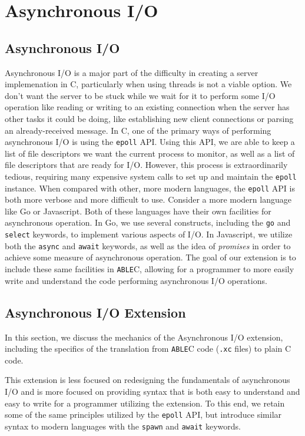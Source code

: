 \documentclass[main.tex]{subfiles}
\begin{document}
\section{Asynchronous I/O}

\subsection{Asynchronous I/O}
Asynchronous I/O is a major part of the difficulty in creating a server
implemenation in C, particularly when using threads is not a viable option. We
don't want the server to be stuck while we wait for it to perform some I/O
operation like reading or writing to an existing connection when the server has
other tasks it could be doing, like establishing new client connections or
parsing an already-received message. In C, one of the primary ways of performing
asynchronous I/O is using the \verb|epoll| API. Using this API, we are able to
keep a list of file descriptors we want the current process to monitor, as well
as a list of file descriptors that are ready for I/O. However, this process is
extraordinarily tedious, requiring many expensive system calls to set up and
maintain the \verb|epoll| instance. When compared with other, more modern
languages, the \verb|epoll| API is both more verbose and more difficult to use.
Consider a more modern language like Go or Javascript. Both of these languages
have their own facilities for asynchronous operation. In Go, we use several
constructs, including the \verb|go| and \verb|select| keywords, to implement
various aspects of I/O. In Javascript, we utilize both the \verb|async| and
\verb|await| keywords, as well as the idea of \emph{promises} in order to
achieve some measure of asynchronous operation. The goal of our extension is to
include these same facilities in \verb|ABLE|C, allowing for a programmer to more
easily write and understand the code performing asynchronous I/O operations.

\subsection{Asynchronous I/O Extension}
In this section, we discuss the mechanics of the Asynchronous I/O extension, including
the specifics of the translation from \verb|ABLE|C code (\verb|.xc| files) to plain C code.

This extension is less focused on redesigning the fundamentals of asynchronous I/O and is more focused
on providing syntax that is both easy to understand and easy to write for a programmer utilizing the extension.
To this end, we retain some of the same principles utilized by the \verb|epoll| API, but introduce similar syntax to
modern languages with the \verb|spawn| and \verb|await| keywords.
\end{document}
